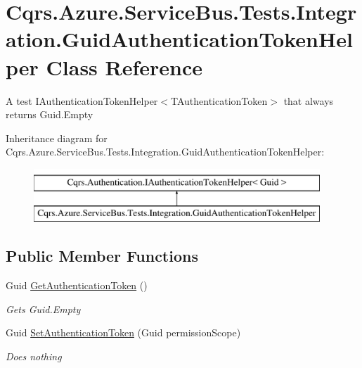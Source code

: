 \hypertarget{classCqrs_1_1Azure_1_1ServiceBus_1_1Tests_1_1Integration_1_1GuidAuthenticationTokenHelper}{}\section{Cqrs.\+Azure.\+Service\+Bus.\+Tests.\+Integration.\+Guid\+Authentication\+Token\+Helper Class Reference}
\label{classCqrs_1_1Azure_1_1ServiceBus_1_1Tests_1_1Integration_1_1GuidAuthenticationTokenHelper}


A test I\+Authentication\+Token\+Helper$<$\+T\+Authentication\+Token$>$ that always returns Guid.\+Empty  


Inheritance diagram for Cqrs.\+Azure.\+Service\+Bus.\+Tests.\+Integration.\+Guid\+Authentication\+Token\+Helper\+:\begin{figure}[H]
\begin{center}
\leavevmode
\includegraphics[height=2.000000cm]{classCqrs_1_1Azure_1_1ServiceBus_1_1Tests_1_1Integration_1_1GuidAuthenticationTokenHelper}
\end{center}
\end{figure}
\subsection*{Public Member Functions}
\begin{DoxyCompactItemize}
\item 
Guid \hyperlink{classCqrs_1_1Azure_1_1ServiceBus_1_1Tests_1_1Integration_1_1GuidAuthenticationTokenHelper_abf0d4aa030e3cc15830301225ef28eac_abf0d4aa030e3cc15830301225ef28eac}{Get\+Authentication\+Token} ()
\begin{DoxyCompactList}\small\item\em Gets Guid.\+Empty \end{DoxyCompactList}\item 
Guid \hyperlink{classCqrs_1_1Azure_1_1ServiceBus_1_1Tests_1_1Integration_1_1GuidAuthenticationTokenHelper_a651700262491c8cf527e3a3881198050_a651700262491c8cf527e3a3881198050}{Set\+Authentication\+Token} (Guid permission\+Scope)
\begin{DoxyCompactList}\small\item\em Does nothing \end{DoxyCompactList}\end{DoxyCompactItemize}


